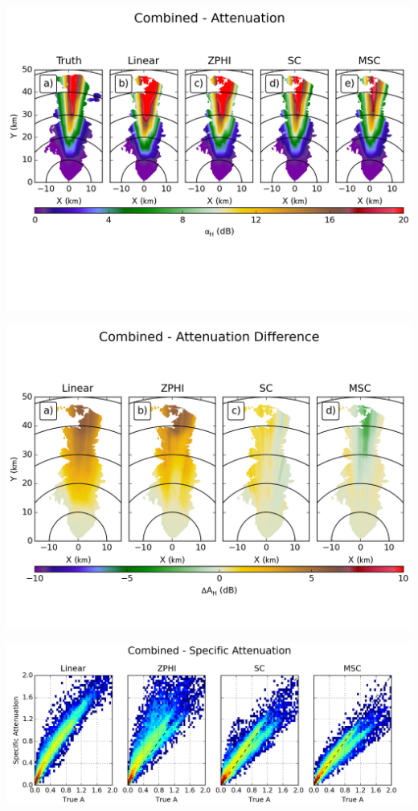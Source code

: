 \documentclass[red]{beamer}
\begin{document}
\begin{frame}
	\begin{center}
		\includegraphics[scale=0.55]{figures/C_Combined_Attenuation.png}
	\end{center}
\end{frame}

\begin{frame}
	\begin{center}
		\includegraphics[scale=0.45]{figures/C_Combined_Attenuation_Difference.png}
	\end{center}
\end{frame}

\begin{frame}
	\begin{center}
		\includegraphics[scale=0.45]{figures/C_Combined_Specific_Attenuation_scatter.png}
	\end{center}
\end{frame}
\end{document}
